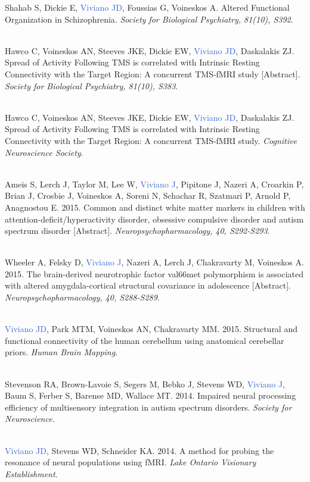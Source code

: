 \documentclass[a4paper,11pt,oneside]{book}
\begin{document}
\begin{flushleft}
Shahab S, Dickie E, \textcolor{highlight}{Viviano JD}, Foussias G, Voineskos A. Altered Functional Organization in Schizophrenia. \textit{Society for Biological Psychiatry, 81(10), S392}. \\\

Hawco C, Voineskos AN, Steeves JKE, Dickie EW, \textcolor{highlight}{Viviano JD}, Daskalakis ZJ. Spread of Activity Following TMS is correlated with Intrinsic Resting Connectivity with the Target Region: A concurrent TMS-fMRI study [Abstract]. \textit{Society for Biological Psychiatry, 81(10), S383}. \\\

Hawco C, Voineskos AN, Steeves JKE, Dickie EW, \textcolor{highlight}{Viviano JD}, Daskalakis ZJ. Spread of Activity Following TMS is correlated with Intrinsic Resting Connectivity with the Target Region: A concurrent TMS-fMRI study. \textit{Cognitive Neuroscience Society}. \\\

Ameis S, Lerch J, Taylor M, Lee W, \textcolor{highlight}{Viviano J}, Pipitone J, Nazeri A, Croarkin P, Brian J, Crosbie J, Voineskos A, Soreni N, Schachar R, Szatmari P, Arnold P, Anagnostou E. 2015. Common and distinct white matter markers in children with attention-deficit/hyperactivity disorder, obsessive compulsive disorder and autism spectrum disorder [Abstract]. \textit{Neuropsychopharmacology, 40, S292-S293}. \\\

Wheeler A, Felsky D, \textcolor{highlight}{Viviano J}, Nazeri A, Lerch J, Chakravarty M, Voineskos A. 2015. The brain-derived neurotrophic factor val66met polymorphism is associated with altered amygdala-cortical structural covariance in adolescence [Abstract]. \textit{Neuropsychopharmacology, 40, S288-S289}. \\\

\textcolor{highlight}{Viviano JD}, Park MTM, Voineskos AN, Chakravarty MM. 2015. Structural and functional connectivity of the human cerebellum using anatomical cerebellar priors. \textit{Human Brain Mapping}. \\\

Stevenson RA, Brown-Lavoie S, Segers M, Bebko J, Stevens WD, \textcolor{highlight}{Viviano J}, Baum S, Ferber S, Barense MD, Wallace MT. 2014. Impaired neural processing efficiency of multisensory integration in autism spectrum disorders. \textit{Society for Neuroscience}. \\\

\textcolor{highlight}{Viviano JD}, Stevens WD, Schneider KA. 2014. A method for probing the resonance of neural populations using fMRI. \textit{Lake Ontario Visionary Establishment}. \\\


\end{flushleft}
\end{document}

